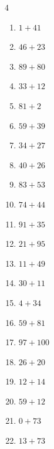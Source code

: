 \begin{multicols}{4}
\begin{enumerate}
  \item $1+41$
        \phantom{$=42$}

  \item $46+23$
        \phantom{$=69$}

  \item $89+80$
        \phantom{$=169$}

  \item $33+12$
        \phantom{$=45$}

  \item $81+2$
        \phantom{$=83$}

  \item $59+39$
        \phantom{$=98$}

  \item $34+27$
        \phantom{$=61$}

  \item $40+26$
        \phantom{$=66$}

  \item $83+53$
        \phantom{$=136$}

  \item $74+44$
        \phantom{$=118$}

  \item $91+35$
        \phantom{$=126$}

  \item $21+95$
        \phantom{$=116$}

  \item $11+49$
        \phantom{$=60$}

  \item $30+11$
        \phantom{$=41$}

  \item $4+34$
        \phantom{$=38$}

  \item $59+81$
        \phantom{$=140$}

  \item $97+100$
        \phantom{$=197$}

  \item $26+20$
        \phantom{$=46$}

  \item $12+14$
        \phantom{$=26$}

  \item $59+12$
        \phantom{$=71$}

  \item $0+73$
        \phantom{$=73$}

  \item $13+73$
        \phantom{$=86$}


\end{enumerate}
\end{multicols}
